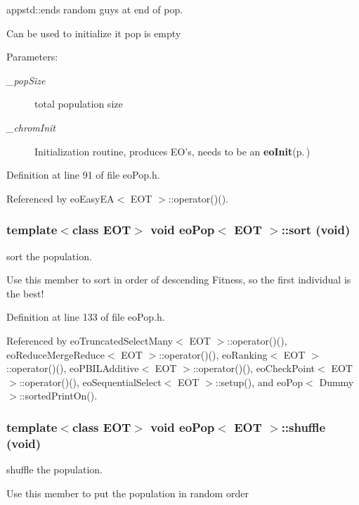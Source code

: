 appstd::ends random guys at end of pop. 

Can be used to initialize it pop is empty

\begin{Desc}
\item[Parameters:]
\begin{description}
\item[{\em \_\-pop\-Size}]total population size \item[{\em \_\-chrom\-Init}]Initialization routine, produces EO's, needs to be an {\bf eo\-Init}{\rm (p.\,\pageref{classeo_init})}\end{description}
\end{Desc}


Definition at line 91 of file eo\-Pop.h.

Referenced by eo\-Easy\-EA$<$ EOT $>$::operator()().
\subsubsection{\setlength{\rightskip}{0pt plus 5cm}template$<$class EOT$>$ void {\bf eo\-Pop}$<$ {\bf EOT} $>$::sort (void)\hspace{0.3cm}{\tt  [inline]}}\label{classeo_pop_a5}


sort the population. 

Use this member to sort in order of descending Fitness, so the first individual is the best! 

Definition at line 133 of file eo\-Pop.h.

Referenced by eo\-Truncated\-Select\-Many$<$ EOT $>$::operator()(), eo\-Reduce\-Merge\-Reduce$<$ EOT $>$::operator()(), eo\-Ranking$<$ EOT $>$::operator()(), eo\-PBILAdditive$<$ EOT $>$::operator()(), eo\-Check\-Point$<$ EOT $>$::operator()(), eo\-Sequential\-Select$<$ EOT $>$::setup(), and eo\-Pop$<$ Dummy $>$::sorted\-Print\-On().
\subsubsection{\setlength{\rightskip}{0pt plus 5cm}template$<$class EOT$>$ void {\bf eo\-Pop}$<$ {\bf EOT} $>$::shuffle (void)\hspace{0.3cm}{\tt  [inline]}}\label{classeo_pop_a7}


shuffle the population. 

Use this member to put the population in random order 

